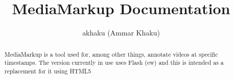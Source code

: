 \documentclass{article}
\begin{document}
\title{MediaMarkup Documentation}
\author{akhaku (Ammar Khaku)}

\maketitle

\begin{abstract}
MediaMarkup is a tool used for, among other things, annotate videos at specific
timestamps. The version currently in use uses Flash (ew) and this is intended as
a replacement for it using HTML5
\end{abstract}
\end{document}
